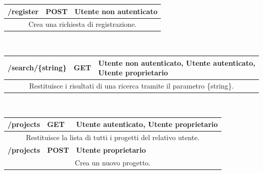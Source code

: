 \begin{table}[h]
	\begin{tabular}{|p{}|p{}|p{}|}
		\toprule
		\textbf{/register} & \textbf{POST} & \textbf{Utente non autenticato} \\ \midrule
		\multicolumn{3}{|c|}{Crea una richiesta di registrazione.} \\
		\bottomrule
	\end{tabular}\\
	\par\bigskip
	
	\begin{tabular}{|p{}|p{}|p{}|}
		\toprule
		\textbf{/search/\{string\}} & \textbf{GET} & \textbf{Utente non autenticato, Utente autenticato, Utente proprietario} \\ \midrule
		\multicolumn{3}{|c|}{Restituisce i risultati di una ricerca tramite il parametro \{string\}.} \\
		\bottomrule
	\end{tabular}\\
	\par\bigskip
	
	\begin{tabular}{|p{}|p{}|p{}|}
		\toprule
		\textbf{/projects} & \textbf{GET} & \textbf{Utente autenticato, Utente proprietario} \\ \midrule
		\multicolumn{3}{|c|}{Restituisce la lista di tutti i progetti del relativo utente.} \\
		\bottomrule
		\textbf{/projects} & \textbf{POST} & \textbf{Utente proprietario} \\ \midrule
		\multicolumn{3}{|c|}{Crea un nuovo progetto.} \\
		\bottomrule
	\end{tabular}
\end{table}
\newpage

